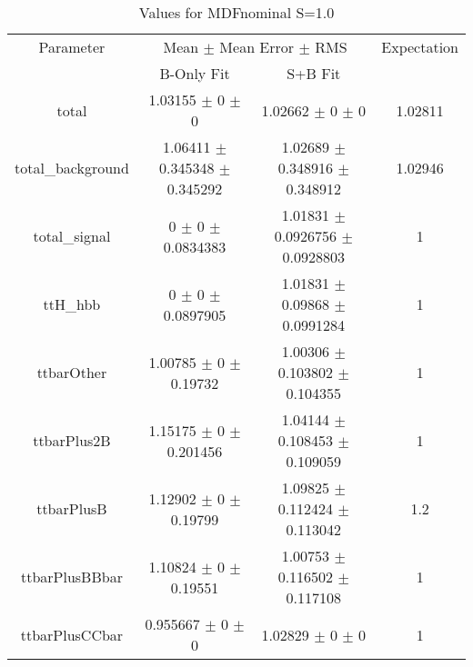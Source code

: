\begin{table}
\centering
\caption{Values for MDFnominal S=1.0}
\begin{tabular}{cccc}
\toprule
Parameter & \multicolumn{2}{c}{Mean $\pm$ Mean Error $\pm$ RMS} & Expectation\\
 & B-Only Fit & S+B Fit & \\
\midrule
total & \num{1.03155} $\pm$ \num{0} $\pm$ \num{0} & \num{1.02662} $\pm$ \num{0} $\pm$ \num{0} & \num{1.02811}\\
total\_background & \num{1.06411} $\pm$ \num{0.345348} $\pm$ \num{0.345292} & \num{1.02689} $\pm$ \num{0.348916} $\pm$ \num{0.348912} & \num{1.02946}\\
total\_signal & \num{0} $\pm$ \num{0} $\pm$ \num{0.0834383} & \num{1.01831} $\pm$ \num{0.0926756} $\pm$ \num{0.0928803} & \num{1}\\
ttH\_hbb & \num{0} $\pm$ \num{0} $\pm$ \num{0.0897905} & \num{1.01831} $\pm$ \num{0.09868} $\pm$ \num{0.0991284} & \num{1}\\
ttbarOther & \num{1.00785} $\pm$ \num{0} $\pm$ \num{0.19732} & \num{1.00306} $\pm$ \num{0.103802} $\pm$ \num{0.104355} & \num{1}\\
ttbarPlus2B & \num{1.15175} $\pm$ \num{0} $\pm$ \num{0.201456} & \num{1.04144} $\pm$ \num{0.108453} $\pm$ \num{0.109059} & \num{1}\\
ttbarPlusB & \num{1.12902} $\pm$ \num{0} $\pm$ \num{0.19799} & \num{1.09825} $\pm$ \num{0.112424} $\pm$ \num{0.113042} & \num{1.2}\\
ttbarPlusBBbar & \num{1.10824} $\pm$ \num{0} $\pm$ \num{0.19551} & \num{1.00753} $\pm$ \num{0.116502} $\pm$ \num{0.117108} & \num{1}\\
ttbarPlusCCbar & \num{0.955667} $\pm$ \num{0} $\pm$ \num{0} & \num{1.02829} $\pm$ \num{0} $\pm$ \num{0} & \num{1}\\
\bottomrule
\end{tabular}
\end{table}